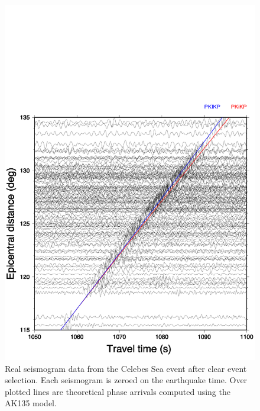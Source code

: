 \documentclass[11pt,a4paper]{article}
\begin{document}
\begin{figure}
	\includegraphics[width=\textwidth]{figures/celebessea_real.pdf}
	\caption{Real seismogram data from the Celebes Sea event after clear event selection. Each seismogram is zeroed on the earthquake time. Over plotted lines are theoretical phase arrivals computed using the AK135 model.}
	\label{fig:Real nonaligned}
\end{figure}
\end{document}
